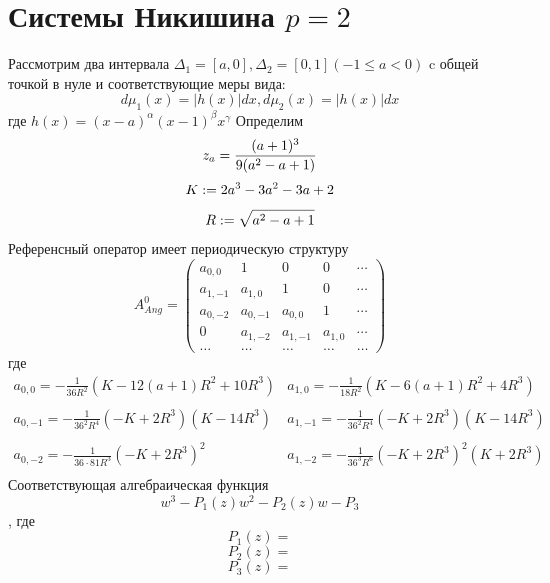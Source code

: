 \documentclass{report}
\begin{document}
\section{Системы Никишина $p=2$}
Рассмотрим два интервала $\Delta_1=[a,0], \Delta_2=[0,1] (-1 \leq a <0)$ c общей точкой в нуле и соответствующие меры вида:
$$
d\mu_1(x)=|h(x)|dx, d\mu_2(x)=|h(x)|dx
$$ 
где $h(x)=(x-a)^\alpha(x-1)^\beta x^\gamma$
Определим
$$
z_a=\frac{(a+1)^3}{9(a^2-a+1)} \\
$$
$$
K :=2a^3-3a^2-3a+2 \\ 
$$
$$
R :=\sqrt{a^2-a+1} \\
$$
Референсный оператор имеет периодическую структуру
$$
A^0_{Ang}=
\left(\begin{array}{cccccccccccc}
a_{0,0}  & 1 		& 0 	  & 0 		 &  \cdots \\
a_{1,-1} & a_{1,0}  & 1 	  & 0 		 &  \cdots \\
a_{0,-2} & a_{0,-1} & a_{0,0} & 1 		 &  \cdots \\
0 		 & a_{1,-2} & a_{1,-1} & a_{1,0} &  \cdots \\
\ldots & \ldots & \ldots & \ldots & \ldots
\end{array}\right)
$$
где 
$$
\begin{array}{llllllllllllllll}
a_{0,0} = -\displaystyle\frac {1}{36R^2} \left( K -12(a+1)R^2+10R^3\right) & a_{1,0}=-\displaystyle\frac{1}{18R^2} (K-6(a+1)R^2+4R^3) \\ \\ 
a_{0,-1}=-\displaystyle\frac{1}{36^2R^4}(-K+2R^3)(K-14R^3) & a_{1,-1}=-\displaystyle\frac{1}{36^2R^4}(-K+2R^3)(K-14R^3)\\ \\
a_{0,-2}=-\displaystyle\frac{1}{36\cdot 81 R^3}(-K+2R^3)^2 & a_{1,-2}=-\displaystyle\frac{1}{36^3 R^6}(-K+2R^3)^2(K+2R^3) \\
\end{array}
$$
Соответствующая алгебраическая функция
$$
w^3-P_1(z)w^2-P_2(z)w-P_3
$$
, где
$$
P_1(z)=
$$
$$
P_2(z)=
$$
$$
P_3(z)=
$$
\end{document}
